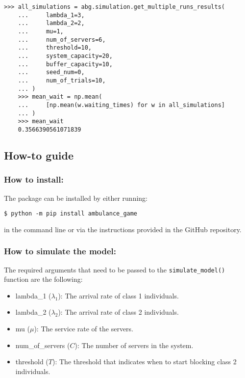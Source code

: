 \begin{lstlisting}[style=pystyle]
    >>> all_simulations = abg.simulation.get_multiple_runs_results(
    ...     lambda_1=3,
    ...     lambda_2=2,
    ...     mu=1,
    ...     num_of_servers=6,
    ...     threshold=10,
    ...     system_capacity=20,
    ...     buffer_capacity=10,
    ...     seed_num=0,
    ...     num_of_trials=10,
    ... )
    >>> mean_wait = np.mean(
    ...     [np.mean(w.waiting_times) for w in all_simulations]
    ... )
    >>> mean_wait
    0.3566390561071839

\end{lstlisting}


\subsection{How-to guide}

\subsubsection{How to install:}
The package can be installed by either running:

\begin{lstlisting}[style=terminalstyle]
    $ python -m pip install ambulance_game
\end{lstlisting}

in the command line or via the instructions provided in the GitHub repository.

\subsubsection{How to simulate the model:}
The required arguments that need to be passed to the 
\lstinline[style=pystyle]{simulate_model()} function
are the following:
\begin{itemize}
    \item lambda\_1 (\(\lambda_1\)): The arrival rate of class 1 individuals.
    \item lambda\_2 (\(\lambda_2\)): The arrival rate of class 2 individuals.
    \item mu (\(\mu\)): The service rate of the servers.
    \item num\_of\_servers (\(C\)): The number of servers in the system.
    \item threshold (\(T\)): The threshold that indicates when to start blocking 
    class 2 individuals.
\end{itemize}

